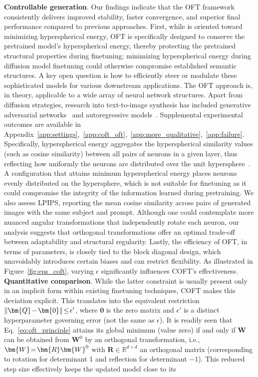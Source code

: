 \begin{itemize}[leftmargin=*,nosep]
\begin{itemize}[leftmargin=*,nosep]
{\textbf{Controllable generation}. Our findings indicate that the OFT framework consistently delivers improved stability, faster convergence, and superior final performance compared to previous approaches. First, while \cite{liu2021orthogonal} is oriented toward minimizing hyperspherical energy, OFT is specifically designed to conserve the pretrained model’s hyperspherical energy, thereby protecting the pretrained structural properties during finetuning; minimizing hyperspherical energy during diffusion model finetuning could otherwise compromise established semantic structures. A key open question is how to efficiently steer or modulate these sophisticated models for various downstream applications. The OFT approach is, in theory, applicable to a wide array of neural network structures. Apart from diffusion strategies, research into text-to-image synthesis has included generative adversarial networks~\cite{reed2016generative,zhang2017stackgan,xu2018attngan,li2019controllable} and autoregressive models~\cite{ramesh2021zero,ding2021cogview,wu2022nuwa,yuscaling}. Supplemental experimental outcomes are available in Appendix~\ref{app:settings},~\ref{app:coft_oft},~\ref{app:more_qualitative},~\ref{app:failure}. Specifically, hyperspherical energy aggregates the hyperspherical similarity values (such as cosine similarity) between all pairs of neurons in a given layer, thus reflecting how uniformly the neurons are distributed over the unit hypersphere~\cite{liu2021learning}. A configuration that attains minimum hyperspherical energy places neurons evenly distributed on the hypersphere, which is not suitable for finetuning as it could compromise the integrity of the information learned during pretraining. We also assess LPIPS, reporting the mean cosine similarity across pairs of generated images with the same subject and prompt. Although one could contemplate more nuanced angular transformations that independently rotate each neuron, our analysis suggests that orthogonal transformations offer an optimal trade-off between adaptability and structural regularity. Lastly, the efficiency of OFT, in terms of parameters, is closely tied to the block diagonal design, which unavoidably introduces certain biases and can restrict flexibility. As illustrated in Figure~\ref{fig:eps_coft}, varying $\epsilon$ significantly influences COFT's effectiveness. \textbf{Quantitative comparison}. While the latter constraint is usually present only in an implicit form within existing finetuning techniques, COFT makes this deviation explicit. This translates into the equivalent restriction $\thickmuskip=2mu \medmuskip=2mu \|\bm{Q}-\bm{0}\|\leq\epsilon'$, where $\bm{0}$ is the zero matrix and $\epsilon'$ is a distinct hyperparameter governing error (not the same as $\epsilon$). It is readily seen that Eq.~\eqref{eq:oft_principle} attains its global minimum (value zero) if and only if $\bm{W}$ can be obtained from $\bm{W}^0$ by an orthogonal transformation, i.e., $\thickmuskip=2mu \medmuskip=2mu \bm{W} = \bm{R}\bm{W}^0$ with $\bm{R}\in\mathbb{R}^{d\times d}$ an orthogonal matrix (corresponding to rotation for determinant 1 and reflection for determinant $-1$). This reduced step size effectively keeps the updated model close to its }
\end{itemize}
\end{itemize}
